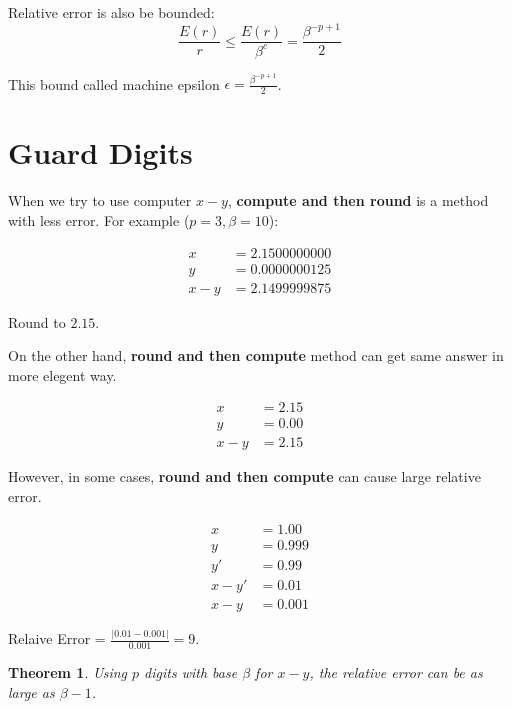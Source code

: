 \documentclass{article}
\newtheorem{theorem}{Theorem}
\begin{document}
        Relative error is also be bounded:
        \[
            \frac{E(r)}{r} \leq \frac{E(r)}{\beta^c} = \frac{\beta^{-p+1}}{2}
        \]
        
        This bound called machine epsilon $\epsilon = \frac{\beta^{-p+1}}{2}$.

        \section{Guard Digits}

        When we try to use computer $x - y$,
        \textbf{compute and then round} is a method with less error. For example ($p = 3, \beta = 10$):
        
        \begin{align}
            x     &= 2.1500000000 \\
            y     &= 0.0000000125 \\
            x - y &= 2.1499999875 
        \end{align}

        Round to $2.15$.

        On the other hand, \textbf{round and then compute}
        method can get same answer in more elegent way.

        \begin{align}
            x     &= 2.15 \\
            y     &= 0.00 \\
            x - y &= 2.15 
        \end{align}

        However, in some cases, \textbf{round and then compute}
        can cause large relative error.

        \begin{align}
            x      &= 1.00  \\
            y      &= 0.999 \\
            y'     &= 0.99  \\
            x - y' &= 0.01  \\
            x - y  &= 0.001
        \end{align}

        Relaive Error = $\frac{|0.01 - 0.001|}{0.001} = 9$.

        \begin{theorem}
            Using $p$ digits with base $\beta$ for $x-y$, the relative error
            can be as large as $\beta - 1$.
        \end{theorem}
\end{document}
